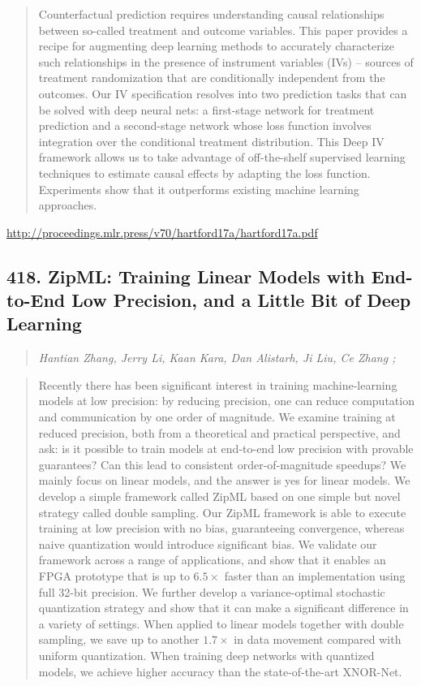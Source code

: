 \documentclass{article}
\begin{document}
\begin{quote}
    Counterfactual prediction requires understanding causal relationships between so-called treatment and outcome variables. This paper provides a recipe for augmenting deep learning methods to accurately characterize such relationships in the presence of instrument variables (IVs) – sources of treatment randomization that are conditionally independent from the outcomes. Our IV specification resolves into two prediction tasks that can be solved with deep neural nets: a first-stage network for treatment prediction and a second-stage network whose loss function involves integration over the conditional treatment distribution. This Deep IV framework allows us to take advantage of off-the-shelf supervised learning techniques to estimate causal effects by adapting the loss function. Experiments show that it outperforms existing machine learning approaches.  
\end{quote}

\href{http://proceedings.mlr.press/v70/hartford17a/hartford17a.pdf}{http://proceedings.mlr.press/v70/hartford17a/hartford17a.pdf}

\subsection{418. ZipML: Training Linear Models with End-to-End Low Precision, and a Little Bit of Deep Learning}

\begin{quote}
\footnotesize{\textit{Hantian Zhang, Jerry Li, Kaan Kara, Dan Alistarh, Ji Liu, Ce Zhang ;}}

\end{quote}

\begin{quote}
    Recently there has been significant interest in training machine-learning models at low precision: by reducing precision, one can reduce computation and communication by one order of magnitude. We examine training at reduced precision, both from a theoretical and practical perspective, and ask: is it possible to train models at end-to-end low precision with provable guarantees? Can this lead to consistent order-of-magnitude speedups? We mainly focus on linear models, and the answer is yes for linear models. We develop a simple framework called ZipML based on one simple but novel strategy called double sampling. Our ZipML framework is able to execute training at low precision with no bias, guaranteeing convergence, whereas naive quantization would introduce significant bias. We validate our framework across a range of applications, and show that it enables an FPGA prototype that is up to $6.5\times$ faster than an implementation using full 32-bit precision. We further develop a variance-optimal stochastic quantization strategy and show that it can make a significant difference in a variety of settings. When applied to linear models together with double sampling, we save up to another $1.7\times$ in data movement compared with uniform quantization. When training deep networks with quantized models, we achieve higher accuracy than the state-of-the-art XNOR-Net.  
\end{quote}
\end{document}
